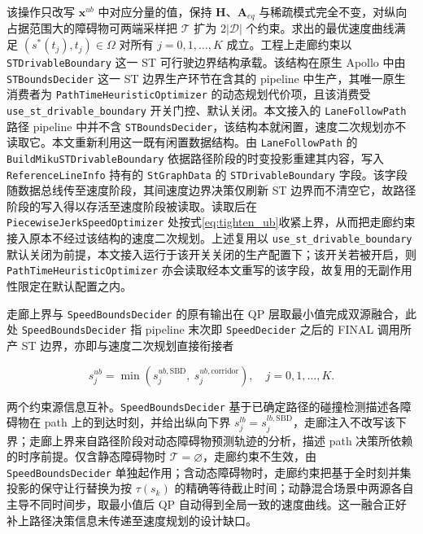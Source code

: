 \documentclass[a4paper,11pt]{ctexart}
\theoremstyle{definition}
\begin{document}
该操作只改写 $\mathbf{x}^{ub}$ 中对应分量的值，保持 $\mathbf{H}$、$\mathbf{A}_{eq}$ 与稀疏模式完全不变，对纵向占据范围大的障碍物可两端采样把 $\mathcal{T}$ 扩为 $2|\mathcal{D}|$ 个约束。求出的最优速度曲线满足 $(s^{*}(t_j), t_j) \in \Omega$ 对所有 $j=0,1,\ldots,K$ 成立。工程上走廊约束以 \texttt{STDrivableBoundary} 这一 ST 可行驶边界结构承载。该结构在原生 Apollo 中由 \texttt{STBoundsDecider} 这一 ST 边界生产环节在含其的 pipeline 中生产，其唯一原生消费者为 \texttt{PathTimeHeuristicOptimizer} 的动态规划代价项，且该消费受 \texttt{use\_st\_drivable\_boundary} 开关门控、默认关闭。本文接入的 \texttt{LaneFollowPath} 路径 pipeline 中并不含 \texttt{STBoundsDecider}，该结构本就闲置，速度二次规划亦不读取它。本文重新利用这一既有闲置数据结构。由 \texttt{LaneFollowPath} 的 \texttt{BuildMikuSTDrivableBoundary} 依据路径阶段的时变投影重建其内容，写入 \texttt{ReferenceLineInfo} 持有的 \texttt{StGraphData} 的 \texttt{STDrivableBoundary} 字段。该字段随数据总线传至速度阶段，其间速度边界决策仅刷新 ST 边界而不清空它，故路径阶段的写入得以存活至速度阶段被读取。读取后在 \texttt{PiecewiseJerkSpeedOptimizer} 处按式\eqref{eq:tighten_ub}收紧上界，从而把走廊约束接入原本不经过该结构的速度二次规划。上述复用以 \texttt{use\_st\_drivable\_boundary} 默认关闭为前提，本文接入运行于该开关关闭的生产配置下；该开关若被开启，则 \texttt{PathTimeHeuristicOptimizer} 亦会读取经本文重写的该字段，故复用的无副作用性限定在默认配置之内。

走廊上界与 \texttt{SpeedBoundsDecider} 的原有输出在 QP 层取最小值完成双源融合，此处 \texttt{SpeedBoundsDecider} 指 pipeline 末次即 \texttt{SpeedDecider} 之后的 FINAL 调用所产 ST 边界，亦即与速度二次规划直接衔接者

\begin{equation}
    s_j^{ub} = \min\!\left(s_j^{ub,\mathrm{SBD}},\ s_j^{ub,\mathrm{corridor}}\right), \quad j = 0,1,\ldots,K.
    \label{eq:dual_source}
\end{equation}

两个约束源信息互补。\texttt{SpeedBoundsDecider} 基于已确定路径的碰撞检测描述各障碍物在 path 上的到达时刻，并给出纵向下界 $s_j^{lb}=s_j^{lb,\mathrm{SBD}}$，走廊注入不改写该下界；走廊上界来自路径阶段对动态障碍物预测轨迹的分析，描述 path 决策所依赖的时序前提。仅含静态障碍物时 $\mathcal{T}=\varnothing$，走廊约束不生效，由 \texttt{SpeedBoundsDecider} 单独起作用；含动态障碍物时，走廊约束把基于全时刻并集投影的保守让行替换为按 $\tau(s_k)$ 的精确等待截止时间；动静混合场景中两源各自主导不同时间步，取最小值后 QP 自动得到全局一致的速度曲线。这一融合正好补上路径决策信息未传递至速度规划的设计缺口。
\end{document}
